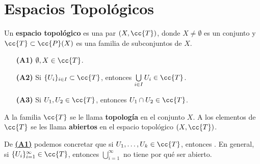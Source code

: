 
\chapter{Espacios Topológicos}

\begin{definicion}
    Un \textbf{espacio topológico} es una par $(X, \cc{T})$, donde $X \neq \emptyset$ es un conjunto y $\cc{T}\subset\cc{P}(X)$ es una familia de subconjuntos de $X$.

    \begin{enumerate}
        \item[\textbf{(\hypertarget{A1}{A1})}] $\emptyset, X \in \cc{T}$.
        \item[\textbf{(\hypertarget{A2}{A2})}] Si $\{U_i\}_{i\in I} \subset \cc{T}$, entonces $\bigcup\limits_{i\in I} U_i \in \cc{T}$.
        \item[\textbf{(\hypertarget{A3}{A3})}] Si $U_1, U_2 \in \cc{T}$, entonces $U_1 \cap U_2 \in \cc{T}$.
    \end{enumerate}

    A la familia $\cc{T}$ se le llama \textbf{topología} en el conjunto $X$. A los elementos de $\cc{T}$ se les llama \textbf{abiertos} en el espacio topológico $(X, \cc{T})$.
\end{definicion}

\vspace*{0.5cm}

\begin{observacion}
    De \hyperlink{A1}{\textbf{(A1)}} podemos concretar que si $U_1, \dots, U_k \in \cc{T}$, entonces .
    En general, si $\{U_i\}_{i=1}^{\infty}\in \cc{T}$, entonces $\bigcup\limits_{i=1}^{\infty}$ no tiene por qué ser abierto.
\end{observacion}

